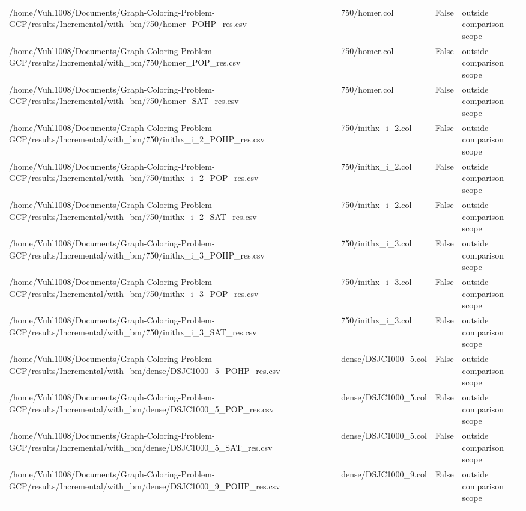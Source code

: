 \begin{table}[htbp]
\begin{tabular}{llll}
/home/Vuhl1008/Documents/Graph-Coloring-Problem-GCP/results/Incremental/with\_bm/750/homer\_POHP\_res.csv & 750/homer.col & False & outside comparison scope \\
/home/Vuhl1008/Documents/Graph-Coloring-Problem-GCP/results/Incremental/with\_bm/750/homer\_POP\_res.csv & 750/homer.col & False & outside comparison scope \\
/home/Vuhl1008/Documents/Graph-Coloring-Problem-GCP/results/Incremental/with\_bm/750/homer\_SAT\_res.csv & 750/homer.col & False & outside comparison scope \\
/home/Vuhl1008/Documents/Graph-Coloring-Problem-GCP/results/Incremental/with\_bm/750/inithx\_i\_2\_POHP\_res.csv & 750/inithx\_i\_2.col & False & outside comparison scope \\
/home/Vuhl1008/Documents/Graph-Coloring-Problem-GCP/results/Incremental/with\_bm/750/inithx\_i\_2\_POP\_res.csv & 750/inithx\_i\_2.col & False & outside comparison scope \\
/home/Vuhl1008/Documents/Graph-Coloring-Problem-GCP/results/Incremental/with\_bm/750/inithx\_i\_2\_SAT\_res.csv & 750/inithx\_i\_2.col & False & outside comparison scope \\
/home/Vuhl1008/Documents/Graph-Coloring-Problem-GCP/results/Incremental/with\_bm/750/inithx\_i\_3\_POHP\_res.csv & 750/inithx\_i\_3.col & False & outside comparison scope \\
/home/Vuhl1008/Documents/Graph-Coloring-Problem-GCP/results/Incremental/with\_bm/750/inithx\_i\_3\_POP\_res.csv & 750/inithx\_i\_3.col & False & outside comparison scope \\
/home/Vuhl1008/Documents/Graph-Coloring-Problem-GCP/results/Incremental/with\_bm/750/inithx\_i\_3\_SAT\_res.csv & 750/inithx\_i\_3.col & False & outside comparison scope \\
/home/Vuhl1008/Documents/Graph-Coloring-Problem-GCP/results/Incremental/with\_bm/dense/DSJC1000\_5\_POHP\_res.csv & dense/DSJC1000\_5.col & False & outside comparison scope \\
/home/Vuhl1008/Documents/Graph-Coloring-Problem-GCP/results/Incremental/with\_bm/dense/DSJC1000\_5\_POP\_res.csv & dense/DSJC1000\_5.col & False & outside comparison scope \\
/home/Vuhl1008/Documents/Graph-Coloring-Problem-GCP/results/Incremental/with\_bm/dense/DSJC1000\_5\_SAT\_res.csv & dense/DSJC1000\_5.col & False & outside comparison scope \\
/home/Vuhl1008/Documents/Graph-Coloring-Problem-GCP/results/Incremental/with\_bm/dense/DSJC1000\_9\_POHP\_res.csv & dense/DSJC1000\_9.col & False & outside comparison scope \\

\end{tabular}
\end{table}
